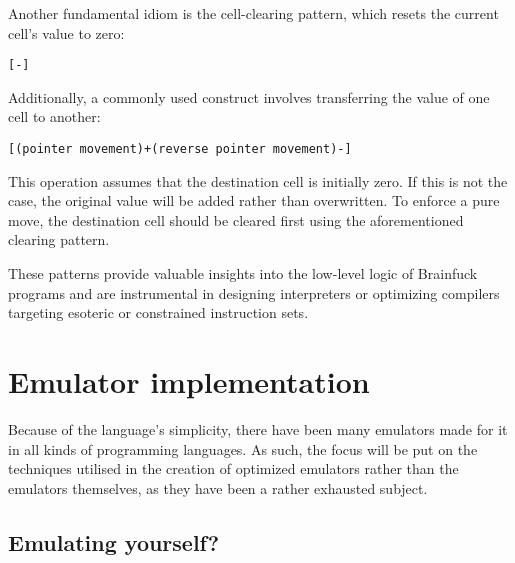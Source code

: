 \par Another fundamental idiom is the cell-clearing pattern, which resets the current cell's value to zero:

\begin{verbatim}
[-]
\end{verbatim}

\par Additionally, a commonly used construct involves transferring the value of one cell to another:

\begin{verbatim}
[(pointer movement)+(reverse pointer movement)-]
\end{verbatim}

\par This operation assumes that the destination cell is initially zero. If this is not the case, the original value will be added rather than overwritten. To enforce a pure move, the destination cell should be cleared first using the aforementioned clearing pattern.

\par These patterns provide valuable insights into the low-level logic of Brainfuck programs and are instrumental in designing interpreters or optimizing compilers targeting esoteric or constrained instruction sets.

\clearpage

\section{Emulator implementation}
\label{sec:ch2sec2}

\par Because of the language's simplicity, there have been many emulators made for it in all kinds of programming languages. As such, the focus will be put on the techniques utilised in the creation of optimized emulators rather than the emulators themselves, as they have been a rather exhausted subject.


\subsection{Emulating yourself?}
\label{sec:ch2sec2sub1}

